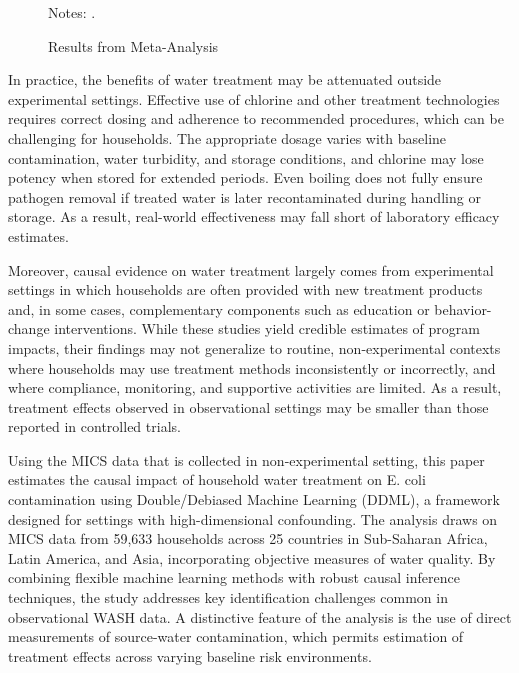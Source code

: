\documentclass [11pt]{article}
\theoremstyle{plain}
\theoremstyle{definition}
\theoremstyle{remark}
\newcommand{\1}{\bm{1}}
\begin{document}
\begin{figure}[htbp]\centering
\caption{Results from Meta-Analysis}\label{Desc_0}
{\footnotesize  \begin{flushleft} Notes: .\end{flushleft}}
\end{figure}

In practice, the benefits of water treatment may be attenuated outside experimental settings. Effective use of chlorine and other treatment technologies requires correct dosing and adherence to recommended procedures, which can be challenging for households. The appropriate dosage varies with baseline contamination, water turbidity, and storage conditions, and chlorine may lose potency when stored for extended periods. Even boiling does not fully ensure pathogen removal if treated water is later recontaminated during handling or storage. As a result, real-world effectiveness may fall short of laboratory efficacy estimates.

Moreover, causal evidence on water treatment largely comes from experimental settings in which households are often provided with new treatment products and, in some cases, complementary components such as education or behavior-change interventions. While these studies yield credible estimates of program impacts, their findings may not generalize to routine, non-experimental contexts where households may use treatment methods inconsistently or incorrectly, and where compliance, monitoring, and supportive activities are limited. As a result, treatment effects observed in observational settings may be smaller than those reported in controlled trials.


Using the MICS data that is collected in non-experimental setting, this paper estimates the causal impact of household water treatment on E. coli contamination using Double/Debiased Machine Learning (DDML), a framework designed for settings with high-dimensional confounding. The analysis draws on MICS data from 59,633 households across 25 countries in Sub-Saharan Africa, Latin America, and Asia, incorporating objective measures of water quality. By combining flexible machine learning methods with robust causal inference techniques, the study addresses key identification challenges common in observational WASH data. A distinctive feature of the analysis is the use of direct measurements of source-water contamination, which permits estimation of treatment effects across varying baseline risk environments. 
\end{document}
